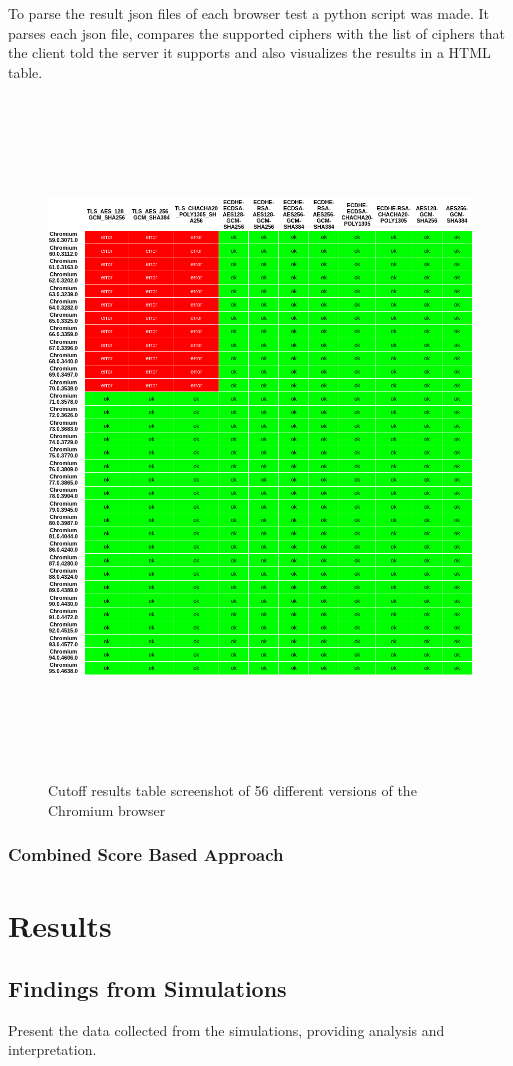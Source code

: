 \documentclass[12pt]{scrbook}
\begin{document}
To parse the result json files of each browser test a python script was made. It parses each json file, compares the supported ciphers
with the list of ciphers that the client told the server it supports and also visualizes the results in a HTML table.  

\begin{figure}[!h]
  \centering
  \includegraphics[height=18cm]{./images/cipher_checker_table.png}
  \caption{Cutoff results table screenshot of 56 different versions of the Chromium browser}
\end{figure}

\newpage \subsection{Combined Score Based Approach}

\chapter{Results} \section{Findings from Simulations} Present the data collected
from the simulations, providing analysis and interpretation.
\end{document}
